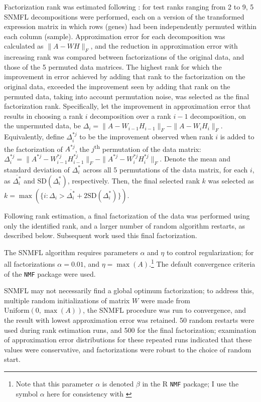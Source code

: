\documentclass[dissertation.tex]{subfiles}
\begin{document}
Factorization rank was estimated following \cite{Frigyesi2008}: for test ranks ranging from 2 to 9, 5 \gls{SNMFL} decompositions were performed, each on a version of the transformed expression matrix in which rows (genes) had been independently permuted within each column (sample).  Approximation error for each decomposition was calculated as $\|A - W H\|_F$, and the reduction in approximation error with increasing rank was compared between factorizations of the original data, and those of the 5 permuted data matrices.  The highest rank for which the improvement in error achieved by adding that rank to the factorization on the original data, exceeded the improvement seen by adding that rank on the permuted data, taking into account permutation noise, was selected as the final factorization rank.  Specifically, let the improvement in approximation error that results in choosing a rank $i$ decomposition over a rank $i-1$ decomposition, on the unpermuted data, be $\Delta_i = \|A - W_{i-1} H_{i-1}\|_F - \|A - W_{i} H_{i}\|_F$.  Equivalently, define $\Delta^{*j}_i$ to be the improvement observed when rank $i$ is added to the factorization of $A^{*j}$, the $j$\textsuperscript{th} permutation of the data matrix: $\Delta^{*j}_i = \|A^{*j} - W^{*j}_{i-1} H^{*j}_{i-1}\|_F - \|A^{*j} - W^{*j}_{i} H^{*j}_{i}\|_F$.  Denote the mean and standard deviation of $\Delta^{*}_i$ across all 5 permutations of the data matrix, for each $i$, as $\overline{\Delta^{*}_i}$ and $\text{SD}(\Delta^{*}_i)$, respectively.  Then, the final selected rank $k$ was selected as $k = \max(\{i : \Delta_i > \overline{\Delta^{*}_i} + 2 \text{SD}(\Delta^{*}_i)\})$.

Following rank estimation, a final factorization of the data was performed using only the identified rank, and a larger number of random algorithm restarts, as described below.  Subsequent work used this final factorization.

The \gls{SNMFL} algorithm requires parameters $\alpha$ and $\eta$ to control regularization; for all factorizations $\alpha = 0.01$, and $\eta = \max(A)$.\footnote{Note that this parameter $\alpha$ is denoted $\beta$ in the R \texttt{NMF} package; I use the symbol $\alpha$ here for consistency with \cite{Kim2007}}  The default convergence criteria of the \texttt{NMF} package were used.

\gls{SNMFL} may not necessarily find a global optimum factorization; to address this, multiple random initializations of matrix $W$ were made from $\text{Uniform}(0, \max(A))$, the \gls{SNMFL} procedure was run to convergence, and the result with lowest approximation error was retained.  50 random restarts were used during rank estimation runs, and 500 for the final factorization; examination of approximation error distributions for these repeated runs indicated that these values were conservative, and factorizations were robust to the choice of random start.
\end{document}
